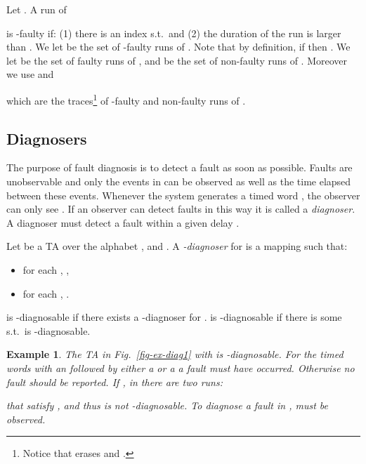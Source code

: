 \documentclass[letterpaper,10pt,conference]{ieeeconf}  \IEEEoverridecommandlockouts                              \overrideIEEEmargins
\def\st{{s.t.}~}
\newtheorem{example}{Example}
\def\endef{\ifmmode\squareforged\else{\unskip\nobreak\hfil
\penalty50\hskip1em\null\nobreak\hfil
\parfillskip=0pt\finalhyphendemerits=0\endgraf}\fi}
\def\endex{\ifmmode\squareforged\else{\unskip\nobreak\hfil
\penalty50\hskip1em\null\nobreak\hfil
\parfillskip=0pt\finalhyphendemerits=0\endgraf}\fi}
\begin{document}
\noindent Let . A run of 

is -faulty if: (1) there is an index  \st  and (2)
the duration of the run  is larger than .  We let
 be the set of -faulty runs of .
Note that by definition, if  then . We let
 be the set of faulty runs of , and  be the set of non-faulty runs of .
Moreover we use   and
 
which are the traces\footnote{Notice that  erases
   and .} of -faulty and non-faulty runs of .

\subsection{Diagnosers}
The purpose of fault diagnosis is to detect a fault as soon as
possible.  Faults are unobservable and only the events in 
can be observed as well as the time elapsed between these events.
Whenever the system generates a timed word , the observer can only
see .  If an observer can detect faults in this
way it is called a \emph{diagnoser}.  A diagnoser must detect a fault
within a given delay .

\begin{definition}[-Diagnoser]\label{def-diag}
  Let  be a TA over the alphabet ,  and .  A
  \emph{-diagnoser} for  is a mapping  such that:
  \begin{itemize}
  \item for each ,
    ,
  \item for each ,
    . \endef
  \end{itemize}
\end{definition}
 is -diagnosable if there exists a
-diagnoser for .  is -diagnosable
if there is some  \st  is
-diagnosable.

\begin{example}
  The TA  in Fig.~\ref{fig-ex-diag1} with
   is -diagnosable.  For the
  timed words with an  followed by either a  or a  a fault
  must have occurred.  Otherwise no fault should be reported.
If , in  there are two runs:
  
  that satisfy , and thus  is
  not -dia\-gnosable. To diagnose a fault in , 
  must be observed. \endex
\end{example}
\end{document}
